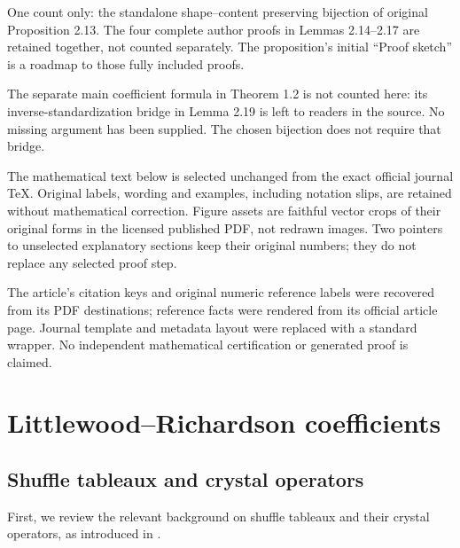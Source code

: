 \documentclass[10pt,a4paper]{article}
\theoremstyle{definition}
\numberwithin{equation}{section}
\begin{document}
One count only: the standalone shape--content preserving bijection of original Proposition 2.13. The four complete author proofs in Lemmas 2.14--2.17 are retained together, not counted separately. The proposition's initial ``Proof sketch'' is a roadmap to those fully included proofs.

The separate main coefficient formula in Theorem 1.2 is not counted here: its inverse-standardization bridge in Lemma 2.19 is left to readers in the source. No missing argument has been supplied. The chosen bijection does not require that bridge.

The mathematical text below is selected unchanged from the exact official journal TeX. Original labels, wording and examples, including notation slips, are retained without mathematical correction. Figure assets are faithful vector crops of their original forms in the licensed published PDF, not redrawn images. Two pointers to unselected explanatory sections keep their original numbers; they do not replace any selected proof step.

The article's citation keys and original numeric reference labels were recovered from its PDF destinations; reference facts were rendered from its official article page. Journal template and metadata layout were replaced with a standard wrapper. No independent mathematical certification or generated proof is claimed.

\setcounter{section}{1}
\setcounter{figure}{4}

\section{Littlewood--Richardson coefficients}

\subsection{Shuffle tableaux and crystal operators}

    First, we review the relevant background on shuffle tableaux and their crystal operators, as introduced in \cite{nguyen2025temperley}.
\end{document}
